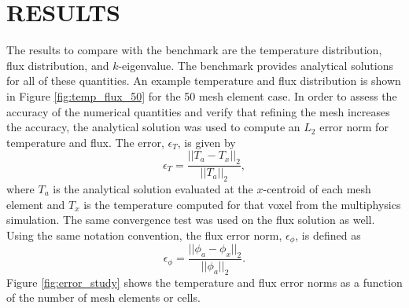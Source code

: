 \documentclass[letterpaper]{mc2023}
\begin{document}
\section{RESULTS}\label{sec:results}
The results to compare with the benchmark are the temperature distribution, flux distribution, and $k$-eigenvalue. The benchmark provides
analytical solutions for all of these quantities. An example temperature and flux distribution is shown in Figure \ref{fig:temp_flux_50}
for the 50 mesh element case. In order to assess the accuracy of the numerical quantities and verify that refining the mesh increases the
accuracy, the analytical solution was used to compute an $L_{2}$ error norm for temperature and flux. The error, $\epsilon_{T}$, is given by
\begin{equation}
    \epsilon_{T} = \frac{|| T_{a} - T_{x} ||_{2}}{|| T_{a} ||_{2}},
\end{equation}
where $T_{a}$ is the analytical solution evaluated at the $x$-centroid of each mesh element and $T_{x}$ is the temperature computed for that
voxel from the multiphysics simulation. The same convergence test was used on the flux solution as well. Using the same notation convention,
the flux error norm, $\epsilon_{\phi}$, is defined as
\begin{equation}
    \epsilon_{\phi} =  \frac{|| \phi_{a} - \phi_{x} ||_{2}}{|| \phi_{a} ||_{2}}.
\end{equation}
Figure \ref{fig:error_study} shows the temperature and flux error norms as a function of the number of mesh elements or cells.
\end{document}
